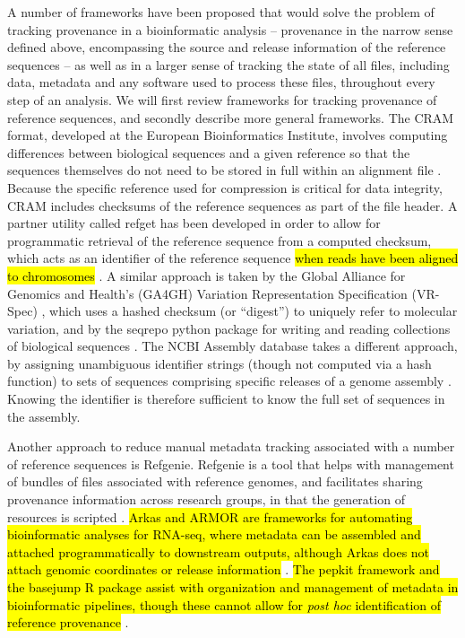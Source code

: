A number of frameworks have been proposed that would solve the problem
of tracking provenance in a bioinformatic analysis -- provenance in
the narrow sense defined above, encompassing the source and release
information of the reference sequences -- as well as in a larger sense
of tracking the state of all files, including data, metadata and
any software used to process these files, throughout every step of an
analysis. We will first review frameworks for tracking provenance of
reference sequences, and secondly describe more general
frameworks. The CRAM format, developed at the European Bioinformatics
Institute, involves computing differences between biological sequences
and a given reference so that the sequences themselves do not need to
be stored in full within an alignment file \cite{cram}. Because the
specific reference used for compression is critical for data
integrity, CRAM includes checksums of the reference sequences as part
of the file header. A partner utility called refget has been developed
in order to allow for programmatic retrieval of the reference sequence
from a computed checksum, which acts as an identifier of the reference
sequence
\hl{when reads have been aligned to chromosomes} \cite{refget}.
A similar approach is taken by the Global
Alliance for Genomics and Health's (GA4GH) Variation Representation
Specification (VR-Spec) \cite{vr}, which uses a hashed checksum (or
``digest'') to uniquely refer to molecular variation, and by the
seqrepo python package for writing and reading collections of
biological sequences \cite{seqrepo}. The NCBI Assembly database takes
a different approach, by assigning unambiguous identifier strings
(though not computed via a hash function) to sets of sequences
comprising specific releases of a genome assembly
\cite{ncbi-assembly}. Knowing the identifier is therefore sufficient
to know the full set of sequences in the assembly.

Another approach to reduce manual metadata tracking associated with a
number of reference sequences is Refgenie. Refgenie is a tool that
helps with management of bundles of files associated with reference
genomes, and facilitates sharing provenance information across
research groups, in that the generation of resources is scripted
\cite{refgenie}.
\hl{Arkas and ARMOR are 
frameworks for automating bioinformatic analyses for RNA-seq, where
metadata can be assembled and attached programmatically to downstream
outputs, although Arkas does not attach genomic coordinates or release
information} \cite{arkas,Orjuelag2019}. 
\hl{The pepkit framework and the basejump R package assist with
organization and management of metadata in bioinformatic pipelines,
though these cannot allow for \textit{post hoc} identification of
reference provenance} \cite{pepkit, basejump}.

